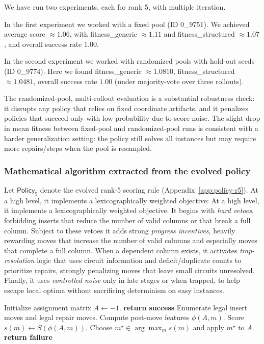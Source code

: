 \documentclass[11pt]{amsart}
\begin{document}
We have run two experiments, each for rank 5, with multiple iteration. 

In the first experiment we worked with a fixed pool (ID 0\_9751). We achieved average score $\approx 1.06$, with fitness\_generic $\approx 1.11$ and fitness\_structured $\approx 1.07$, and overall success rate $1.00$.

In the second experiment we worked with randomized pools with hold-out seeds (ID 0\_9774).
Here we found fitness\_generic $\approx 1.0810$, fitness\_structured $\approx 1.0481$, overall success rate $1.00$ (under majority-vote over three rollouts).

The randomized-pool, multi-rollout evaluation is a substantial robustness check: it disrupts any policy that relies on fixed coordinate artifacts, and it penalizes policies that succeed only with low probability due to score noise.
The slight drop in mean fitness between fixed-pool and randomized-pool runs is consistent with a harder generalization setting: the policy still solves all instances but may require more repairs/steps when the pool is resampled.

\subsubsection{Mathematical algorithm extracted from the evolved policy}

Let $\mathsf{Policy}_5$ denote the evolved rank-5 scoring rule (Appendix~\ref{app:policy-r5}).
At a high level, it implements a lexicographically weighted objective:
At a high level, it implements a lexicographically weighted objective. It begins with \emph{hard vetoes}, forbidding inserts that reduce the number of valid columns or that break a full column. Subject to these vetoes it adds strong \emph{progress incentives}, heavily rewarding moves that increase the number of valid columns and especially moves that complete a full column. When a dependent column exists, it activates \emph{trap-resolution} logic that uses circuit information and deficit/duplicate counts to prioritize repairs, strongly penalizing moves that leave small circuits unresolved. Finally, it uses \emph{controlled noise} only in late stages or when trapped, to help escape local optima without sacrificing determinism on easy instances.



\begin{algorithm}[h]
\caption{Greedy local-exchange construction (as used in all experiments)}
\begin{algorithmic}[1]
\State Initialize assignment matrix $A\leftarrow -1$.
   \State \textbf{return success} \EndIf
  \State Enumerate legal insert moves and legal repair moves.
    \State Compute post-move features $\phi(A,m)$.
    \State Score $s(m)\leftarrow S(\phi(A,m))$.
  \EndFor
  \State Choose $m^\star \in \arg\max_m s(m)$ and apply $m^\star$ to $A$.
\EndFor
\State \textbf{return failure}
\end{algorithmic}
\end{algorithm}
\end{document}
